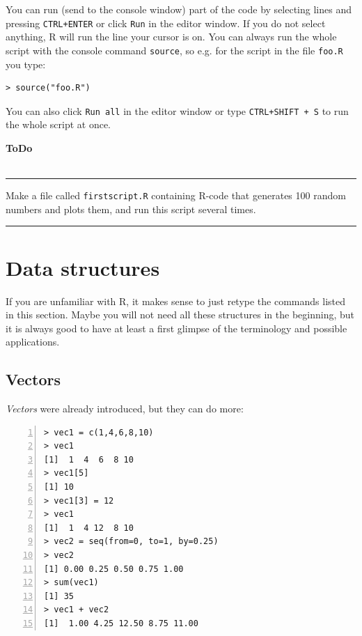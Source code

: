 \documentclass[a4paper,11pt,twocolumn,tablecaptionabove]{scrartcl} %
\newenvironment{ToDo} {%
  \begin{flushright}
    \hfill
    \begin{minipage}{0.95\columnwidth}         %
    \textsf{\textbf{ToDo}} \\
      \vspace{-0.85cm}\\
      {\color{Gray}\rule[-0.1cm]{\columnwidth}{1.5pt}}} { %
      {\color{Gray} \rule[0.3cm]{\columnwidth}{1.5pt}}
    \end{minipage}
    \vspace{1em}
  \end{flushright}
  }
\begin{document}
You can run (send to the console window) part of the code by selecting lines and pressing \texttt{CTRL+ENTER} or click \texttt{Run} in the editor window.
If you do not select anything, R will run the line your cursor is on.
You can always  run the whole script with the console command \texttt{source},
so e.g. for the script in the file \texttt{foo.R} you type:
\begin{Verbatim}[frame=single,gobble=0]
> source("foo.R")
\end{Verbatim}
You can also click \texttt{Run all} in the editor window or type \texttt{CTRL+SHIFT + S} to run the whole script at once.

\begin{ToDo}
  Make a file called \texttt{firstscript.R} containing R-code that generates 100
  random numbers and plots them, and run this script several times.\\
\end{ToDo}


\section{Data structures} 
\label{sec:structures}

If you are unfamiliar with R, it makes sense to just retype the commands
listed in this section. Maybe you will not need all these structures in the
beginning, but it is always good to have at least a first glimpse of the
terminology and possible applications.

\subsection{Vectors}

\emph{Vectors} were already introduced, but they can do more:

\begin{Verbatim}[frame=single,numbers=left,gobble=0, xleftmargin=0.35cm, numbersep=0.1cm]
> vec1 = c(1,4,6,8,10)
> vec1
[1]  1  4  6  8 10
> vec1[5]
[1] 10
> vec1[3] = 12
> vec1
[1]  1  4 12  8 10
> vec2 = seq(from=0, to=1, by=0.25)
> vec2
[1] 0.00 0.25 0.50 0.75 1.00
> sum(vec1)
[1] 35
> vec1 + vec2
[1]  1.00 4.25 12.50 8.75 11.00
\end{Verbatim}
\end{document}

